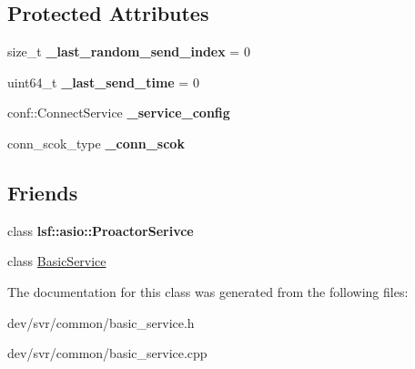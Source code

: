 \subsection*{Protected Attributes}
\begin{DoxyCompactItemize}
\item 
\hypertarget{classBasicConnectService_afa7b12cfcda639d51e3a82d62e61e64e}{
size\_\-t {\bfseries \_\-last\_\-random\_\-send\_\-index} = 0}
\label{classBasicConnectService_afa7b12cfcda639d51e3a82d62e61e64e}

\item 
\hypertarget{classBasicConnectService_a9f614d54d1162ad90dfb168991ba1453}{
uint64\_\-t {\bfseries \_\-last\_\-send\_\-time} = 0}
\label{classBasicConnectService_a9f614d54d1162ad90dfb168991ba1453}

\item 
\hypertarget{classBasicConnectService_a7fb3cdc37a792b3fe0423d2082481279}{
conf::ConnectService {\bfseries \_\-service\_\-config}}
\label{classBasicConnectService_a7fb3cdc37a792b3fe0423d2082481279}

\item 
\hypertarget{classBasicConnectService_a7b17059cd7830dec6f65fe5bd7e494e4}{
conn\_\-scok\_\-type {\bfseries \_\-conn\_\-scok}}
\label{classBasicConnectService_a7b17059cd7830dec6f65fe5bd7e494e4}

\end{DoxyCompactItemize}
\subsection*{Friends}
\begin{DoxyCompactItemize}
\item 
\hypertarget{classBasicConnectService_a8e807eb450b87a443cee5956b3d556d3}{
class {\bfseries lsf::asio::ProactorSerivce}}
\label{classBasicConnectService_a8e807eb450b87a443cee5956b3d556d3}

\item 
\hypertarget{classBasicConnectService_ae76adcf38331892fcc17b32e98f08bc7}{
class \hyperlink{classBasicConnectService_ae76adcf38331892fcc17b32e98f08bc7}{BasicService}}
\label{classBasicConnectService_ae76adcf38331892fcc17b32e98f08bc7}

\end{DoxyCompactItemize}


The documentation for this class was generated from the following files:\begin{DoxyCompactItemize}
\item 
dev/svr/common/basic\_\-service.h\item 
dev/svr/common/basic\_\-service.cpp\end{DoxyCompactItemize}
